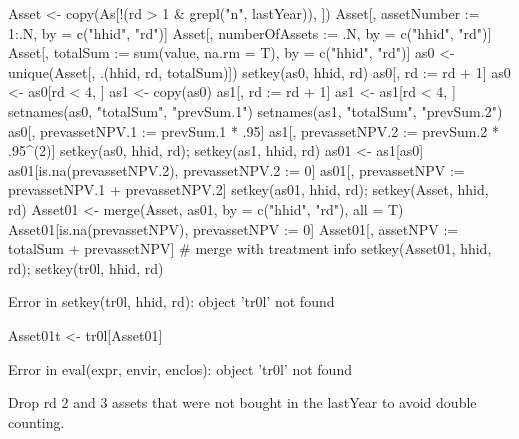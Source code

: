 \begin{Schunk}
\begin{Sinput}
Asset <- copy(As[!(rd > 1 & grepl("n", lastYear)), ])
Asset[, assetNumber := 1:.N, by = c("hhid", "rd")]
Asset[, numberOfAssets := .N, by = c("hhid", "rd")]
Asset[, totalSum := sum(value, na.rm = T), by = c("hhid", "rd")]
as0 <- unique(Asset[, .(hhid, rd, totalSum)])
setkey(as0, hhid, rd)
as0[, rd := rd + 1]
as0 <- as0[rd < 4, ]
as1 <- copy(as0)
as1[, rd := rd + 1]
as1 <- as1[rd < 4, ]
setnames(as0, "totalSum", "prevSum.1")
setnames(as1, "totalSum", "prevSum.2")
as0[, prevassetNPV.1 := prevSum.1 * .95]
as1[, prevassetNPV.2 := prevSum.2 * .95^(2)]
setkey(as0, hhid, rd); setkey(as1, hhid, rd)
as01 <- as1[as0]
as01[is.na(prevassetNPV.2), prevassetNPV.2 := 0]
as01[, prevassetNPV := prevassetNPV.1 + prevassetNPV.2]
setkey(as01, hhid, rd); setkey(Asset, hhid, rd)
Asset01 <- merge(Asset, as01, by = c("hhid", "rd"), all = T)
Asset01[is.na(prevassetNPV), prevassetNPV := 0]
Asset01[, assetNPV := totalSum + prevassetNPV]
# merge with treatment info
setkey(Asset01, hhid, rd); setkey(tr0l, hhid, rd)
\end{Sinput}
\begin{Soutput}
Error in setkey(tr0l, hhid, rd): object 'tr0l' not found
\end{Soutput}
\begin{Sinput}
Asset01t <- tr0l[Asset01]
\end{Sinput}
\begin{Soutput}
Error in eval(expr, envir, enclos): object 'tr0l' not found
\end{Soutput}
\end{Schunk}
Drop rd 2 and 3 assets that were not bought in the \textsf{lastYear} to avoid double counting.
